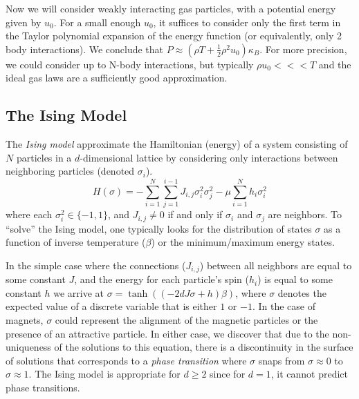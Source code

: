 \documentclass[12pt]{article}
\begin{document}
Now we will consider weakly interacting gas particles, with a potential energy
given by $u_0$.
For a small enough $u_0$, it suffices to consider only the first term in the
Taylor polynomial expansion of the energy function (or equivalently, only 2
body interactions).
We conclude that 
$P \approx \left(\rho T + \frac{1}{2}\rho^2 u_0\right)\kappa_B$.
For more precision, we could consider up to N-body interactions, but typically
$\rho u_0 <<< T$ and the ideal gas laws are a sufficiently good approximation.

\subsection*{The Ising Model}

The {\it Ising model} approximate the Hamiltonian (energy) of a system
consisting of $N$ particles in a $d$-dimensional lattice by considering
only interactions between neighboring particles (denoted $\sigma_i$).
$$
H(\sigma) = -\sum_{i = 1}^N\sum_{j=1}^{i-1} J_{i,j}\sigma_i^2\sigma_j^2
- \mu \sum_{i=1}^N h_i \sigma_i^2
$$
where each $\sigma_i^2 \in \{-1, 1\}$, and $J_{i,j} \neq 0$ if and only if
$\sigma_i$ and $\sigma_j$ are neighbors. To ``solve'' the Ising model, one
typically looks for the distribution of states $\sigma$ as a function of
inverse temperature ($\beta$) or the minimum/maximum energy states.

In the simple case where the connections ($J_{i,j}$) between all neighbors
are equal to some constant $J$, and the energy for each particle's spin
($h_i$) is equal to some constant $h$ we arrive at
$\sigma = \tanh\left((-2dJ\sigma + h)\beta\right)$, where $\sigma$ denotes
the expected value of a discrete variable that is either $1$ or $-1$.
In the case of magnets, $\sigma$ could represent the alignment of the magnetic 
particles or the presence of an attractive particle.
In either case, we discover that due to the non-uniqueness of the solutions
to this equation, there is a discontinuity in the surface of solutions that
corresponds to a {\it phase transition} where $\sigma$ snaps from
$\sigma \approx 0$ to $\sigma \approx 1$. The Ising model is appropriate for
$d\geq 2$ since for $d=1$, it cannot predict phase transitions.
\end{document}
